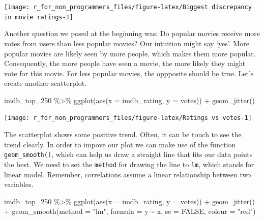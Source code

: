 \documentclass[
]{book}
\newenvironment{Shaded}{\begin{snugshade}}{\end{snugshade}}
\newcommand{\AttributeTok}[1]{\textcolor[rgb]{0.77,0.63,0.00}{#1}}
\newcommand{\ConstantTok}[1]{\textcolor[rgb]{0.00,0.00,0.00}{#1}}
\newcommand{\FunctionTok}[1]{\textcolor[rgb]{0.00,0.00,0.00}{#1}}
\newcommand{\NormalTok}[1]{#1}
\newcommand{\SpecialCharTok}[1]{\textcolor[rgb]{0.00,0.00,0.00}{#1}}
\newcommand{\StringTok}[1]{\textcolor[rgb]{0.31,0.60,0.02}{#1}}
\begin{document}
\begin{center}\texttt{[image: r\_for\_non\_programmers\_files/figure-latex/Biggest discrepancy in movie ratings-1]} \end{center}

Another question we posed at the beginning was: Do popular movies receive more votes from users than less popular movies? Our intuition might say `yes'. More popular movies are likely seen by more people, which makes them more popular. Consequently, the more people have seen a movie, the more likely they might vote for this movie. For less popular movies, the oppposite should be true. Let's create another scatterplot.

\begin{Shaded}
\begin{Highlighting}[]
\NormalTok{imdb\_top\_250 }\SpecialCharTok{\%\textgreater{}\%}
  \FunctionTok{ggplot}\NormalTok{(}\FunctionTok{aes}\NormalTok{(}\AttributeTok{x =}\NormalTok{ imdb\_rating, }\AttributeTok{y =}\NormalTok{ votes)) }\SpecialCharTok{+} 
  \FunctionTok{geom\_jitter}\NormalTok{()}
\end{Highlighting}
\end{Shaded}

\begin{center}\texttt{[image: r\_for\_non\_programmers\_files/figure-latex/Ratings vs votes-1]} \end{center}

The scatterplot shows some positive trend. Often, it can be touch to see the trend clearly. In order to impove our plot we can make use of the function \texttt{geom\_smooth()}, which can help us draw a straight line that fits our data points the best. We need to set the \texttt{method} for drawing the line to \texttt{lm}, which stands for linear model. Remember, correlations assume a linear relationship between two variables.

\begin{Shaded}
\begin{Highlighting}[]
\NormalTok{imdb\_top\_250 }\SpecialCharTok{\%\textgreater{}\%}
  \FunctionTok{ggplot}\NormalTok{(}\FunctionTok{aes}\NormalTok{(}\AttributeTok{x =}\NormalTok{ imdb\_rating, }\AttributeTok{y =}\NormalTok{ votes)) }\SpecialCharTok{+} 
  \FunctionTok{geom\_jitter}\NormalTok{() }\SpecialCharTok{+}
  \FunctionTok{geom\_smooth}\NormalTok{(}\AttributeTok{method =} \StringTok{"lm"}\NormalTok{,}
              \AttributeTok{formula =}\NormalTok{ y }\SpecialCharTok{\textasciitilde{}}\NormalTok{ x,}
              \AttributeTok{se =} \ConstantTok{FALSE}\NormalTok{,}
              \AttributeTok{colour =} \StringTok{"red"}\NormalTok{)}
\end{Highlighting}
\end{Shaded}
\end{document}

